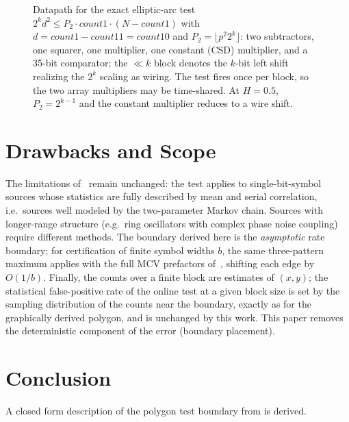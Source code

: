 \documentclass[11pt]{article}
\begin{document}
\begin{figure}[htbp]
\caption{Datapath for the exact elliptic-arc test
$2^k d^2 \le P_2\cdot \mathit{count1}\cdot(N-\mathit{count1})$ with
$d=\mathit{count1}-\mathit{count11}=\mathit{count10}$ and
$P_2=\lfloor p^2 2^k\rfloor$: two subtractors, one squarer, one multiplier,
one constant (CSD) multiplier, and a 35-bit comparator; the $\ll k$ block
denotes the $k$-bit left shift realizing the $2^k$ scaling as wiring. The
test fires once
per block, so the two array multipliers may be time-shared. At $H=0.5$,
$P_2=2^{k-1}$ and the constant multiplier reduces to a wire shift.}
\label{fig:hw}
\end{figure}

\section{Drawbacks and Scope}
\label{sec:drawbacks}

The limitations of~\cite{johnston2024} remain unchanged: the test
applies to single-bit-symbol sources whose statistics are fully described by mean
and serial correlation, i.e.\ sources well modeled by the two-parameter
Markov chain. Sources with longer-range structure (e.g.\ ring oscillators
with complex phase noise coupling) require different methods. The boundary
derived here is the \emph{asymptotic} rate boundary; for certification of
finite symbol widths $b$, the same three-pattern maximum applies with the
full MCV prefactors of~\cite{johnston2024}, shifting each edge by $O(1/b)$.
Finally, the counts over a finite block are estimates of $(x,y)$; the
statistical false-positive rate of the online test at a given block size is
set by the sampling distribution of the counts near the boundary, exactly as
for the graphically derived polygon, and is unchanged by this work.
This paper removes the deterministic component of the error (boundary placement).

\section{Conclusion}

A closed form description of the polygon test boundary from 
\cite{johnston2024} is derived.
\end{document}
